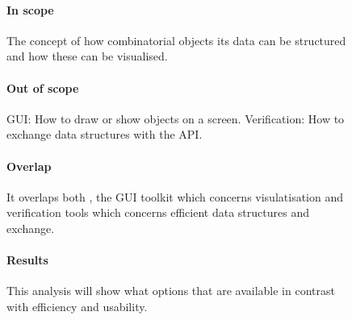 \begin{figure}[!h]
{\begin{boxedminipage}[b]{.32\textwidth}
{	    \paragraph{In scope}
	    The concept of how combinatorial objects its data can be structured
and how these can be visualised.
	    \paragraph{Out of scope}
	    GUI: How to draw or show objects on a screen.
	    Verification: How to exchange data structures with the API.
	    \paragraph{Overlap}
	    It overlaps both , the GUI toolkit which concerns visulatisation and
verification tools which concerns efficient data structures and exchange.
	    \paragraph{Results}
	    This analysis will show what options that are available in contrast
with efficiency and usability.
	}%
    \end{boxedminipage}
    }%
\end{figure}
